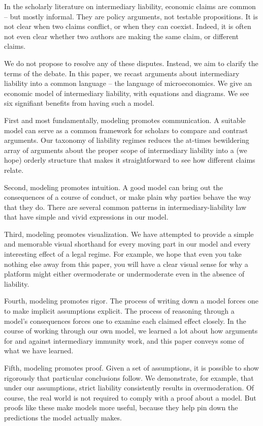 In the scholarly literature on intermediary liability, economic claims are common -- but mostly informal. They are policy arguments, not testable propositions. It is not clear when two claims conflict, or when they can coexist. Indeed, it is often not even clear whether two authors are making the same claim, or different claims.

We do not propose to resolve any of these disputes. Instead, we aim to clarify the terms of the debate. In this paper, we recast arguments about intermediary liability into a common language -- the language of microeconomics. We give an economic model of intermediary liability, with equations and diagrams. We see six signifiant benefits from having such a model.

First and most fundamentally, modeling promotes communication. A suitable model can serve as a common framework for scholars to compare and contrast arguments. Our taxonomy of liability regimes reduces the at-times bewildering array of arguments about the proper scope of intermediary liability into a (we hope) orderly structure that makes it straightforward to see how different claims relate.

Second, modeling promotes intuition. A good model can bring out the consequences of a course of conduct, or make plain why parties behave the way that they do. There are several common patterns in intermediary-liability law that have simple and vivid expressions in our model.

Third, modeling promotes visualization. We have attempted to provide a simple and memorable visual shorthand for every moving part in our model and every interesting effect of a legal regime. For example, we hope that even you take nothing else away from this paper, you will have a clear visual sense for why a platform might either overmoderate or undermoderate even in the absence of liability.

Fourth, modeling promotes rigor. The process of writing down a model forces one to make implicit assumptions explicit. The process of reasoning through a model's consequences forces one to examine each claimed effect closely. In the course of working through our own model, we learned a lot about how arguments for and against intermediary immunity work, and this paper conveys some of what we have learned.

Fifth, modeling promotes proof. Given a set of assumptions, it is possible to show rigorously that particular conclusions follow. We demonstrate, for example, that under our assumptions, strict liability consistently results in overmoderation. Of course, the real world is not required to comply with a proof about a model. But proofs like these make models more useful, because they help pin down the predictions the model actually makes.

